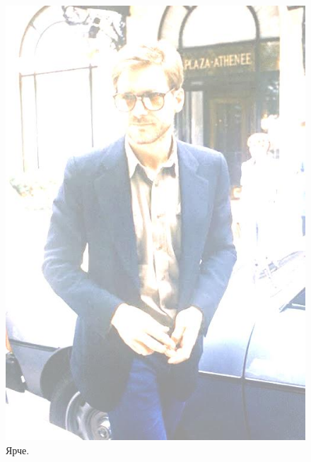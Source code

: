 \documentclass[a4paper,12pt]{article}
\begin{document}
\begin{figure}[h]
\begin{minipage}[h]{0.2\linewidth}
\includegraphics[width=1\linewidth]{Pic_Bright}
Ярче.
\end{minipage}
$\mspace{30mu}$
\begin{minipage}[h]{0.2\linewidth}

\end{minipage}
\end{figure}
\end{document}
